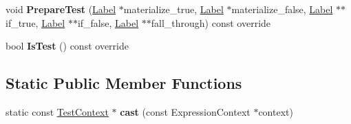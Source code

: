\begin{DoxyCompactItemize}
\item 
void {\bfseries Prepare\+Test} (\hyperlink{classv8_1_1internal_1_1_label}{Label} $\ast$materialize\+\_\+true, \hyperlink{classv8_1_1internal_1_1_label}{Label} $\ast$materialize\+\_\+false, \hyperlink{classv8_1_1internal_1_1_label}{Label} $\ast$$\ast$if\+\_\+true, \hyperlink{classv8_1_1internal_1_1_label}{Label} $\ast$$\ast$if\+\_\+false, \hyperlink{classv8_1_1internal_1_1_label}{Label} $\ast$$\ast$fall\+\_\+through) const  override\hypertarget{classv8_1_1internal_1_1_full_code_generator_1_1_test_context_a9ad1c864500a911c3a2a639f400ff824}{}\label{classv8_1_1internal_1_1_full_code_generator_1_1_test_context_a9ad1c864500a911c3a2a639f400ff824}

\item 
bool {\bfseries Is\+Test} () const  override\hypertarget{classv8_1_1internal_1_1_full_code_generator_1_1_test_context_a551f98616a29f9268029008e10324a5e}{}\label{classv8_1_1internal_1_1_full_code_generator_1_1_test_context_a551f98616a29f9268029008e10324a5e}

\end{DoxyCompactItemize}
\subsection*{Static Public Member Functions}
\begin{DoxyCompactItemize}
\item 
static const \hyperlink{classv8_1_1internal_1_1_full_code_generator_1_1_test_context}{Test\+Context} $\ast$ {\bfseries cast} (const Expression\+Context $\ast$context)\hypertarget{classv8_1_1internal_1_1_full_code_generator_1_1_test_context_a5a47f581fb5ff2e736d964f00d587c85}{}\label{classv8_1_1internal_1_1_full_code_generator_1_1_test_context_a5a47f581fb5ff2e736d964f00d587c85}

\end{DoxyCompactItemize}
